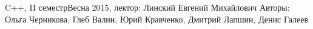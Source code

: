 


\BigHeader
	{C++, II семестр}{Весна 2015, лектор: Линский Евгений Михайлович}
	{Авторы: Ольга Черникова, Глеб Валин, Юрий Кравченко, Дмитрий Лапшин, Денис Галеев}

 










